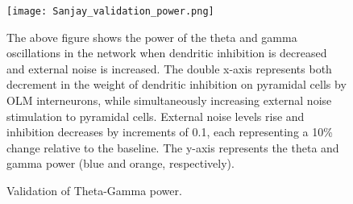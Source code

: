 \begin{figure}[htbp]
    \centering
    \texttt{[image: Sanjay\_validation\_power.png]}
    \caption[Validation of the firing rates]{Validation of Theta-Gamma power.}\label{fig:validation_power}
    \begin{minipage}{0.9\textwidth}
        The above figure shows the power of the theta and gamma oscillations in the network when dendritic inhibition is decreased and external noise is increased.
        The double x-axis represents both decrement in the weight of dendritic inhibition on pyramidal cells by OLM interneurons,
        while simultaneously increasing external noise stimulation to pyramidal cells.
        External noise levels rise and inhibition decreases by increments of 0.1, each representing a 10\% change relative to the baseline.
        The y-axis represents the theta and gamma power (blue and orange, respectively).
    \end{minipage}
\end{figure}

